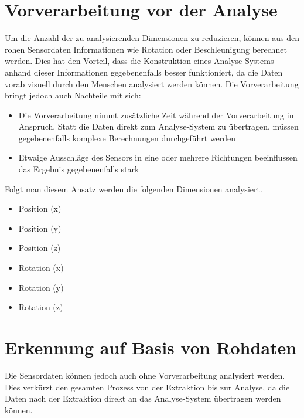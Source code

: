 \section{Vorverarbeitung vor der Analyse}
Um die Anzahl der zu analysierenden Dimensionen zu reduzieren, können aus den rohen Sensordaten Informationen wie Rotation oder Beschleunigung berechnet werden. Dies hat den Vorteil, dass die Konstruktion eines Analyse-Systems anhand dieser Informationen gegebenenfalls besser funktioniert, da die Daten vorab visuell durch den Menschen analysiert werden können. Die Vorverarbeitung bringt jedoch auch Nachteile mit sich:

\begin{itemize} 
\item Die Vorverarbeitung nimmt zusätzliche Zeit während der Vorverarbeitung in Anspruch. Statt die Daten direkt zum Analyse-System zu übertragen, müssen gegebenenfalls komplexe Berechnungen durchgeführt werden 
\item Etwaige Ausschläge des Sensors in eine oder mehrere Richtungen beeinflussen das Ergebnis gegebenenfalls stark
\end{itemize}

Folgt man diesem Ansatz werden die folgenden Dimensionen analysiert.
\begin{itemize} 
\item Position (x)
\item Position (y)
\item Position (z)
\item Rotation (x)
\item Rotation (y)
\item Rotation (z)
\end{itemize}

\section{Erkennung auf Basis von Rohdaten}
Die Sensordaten können jedoch auch ohne Vorverarbeitung analysiert werden. Dies verkürzt den gesamten Prozess von der Extraktion bis zur Analyse, da die Daten nach der Extraktion direkt an das Analyse-System übertragen werden können.

